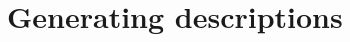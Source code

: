 \documentclass[a4paper,titlepage,final, twoside]{report}
\begin{document}
\section{Generating descriptions}
%
%
%
%
%
\end{document}
